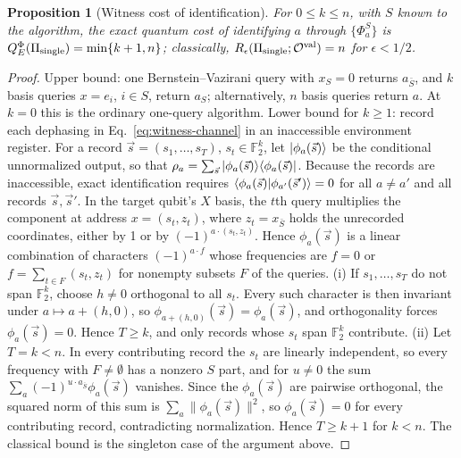 \documentclass[
  aps,
  pra,
  reprint,
  nofootinbib
]{revtex4-2}
\newtheorem{proposition}{Proposition}
\begin{document}
\begin{proposition}[Witness cost of identification]\label{prop:witness}
For \(0\le k\le n\), with \(S\) known to the algorithm, the exact quantum cost
of identifying \(a\) through \(\{\Phi_a^S\}\) is
\(Q_E^{\Phi}(\Pi_{\rm single})=\min\{k+1,n\}\); classically,
\(R_\epsilon(\Pi_{\rm single};\mathcal O^{\mathrm{val}})=n\) for
\(\epsilon<1/2\).
\end{proposition}

\begin{proof}
Upper bound: one Bernstein--Vazirani query with \(x_S=0\) returns
\(a_{\bar S}\), and \(k\) basis queries \(x=e_i\), \(i\in S\), return
\(a_S\); alternatively, \(n\) basis queries return \(a\). At \(k=0\) this is
the ordinary one-query algorithm. Lower bound for \(k\ge1\): record each
dephasing in Eq.~\eqref{eq:witness-channel} in an inaccessible environment
register. For a record \(\vec s=(s_1,\ldots,s_T)\), \(s_t\in\mathbb F_2^k\), let
\(\ket{\phi_a(\vec s)}\) be the conditional unnormalized output, so that
\(\rho_a=\sum_{\vec s}\ket{\phi_a(\vec s)}\!\bra{\phi_a(\vec s)}\). Because the
records are inaccessible, exact identification requires
\(\braket{\phi_a(\vec s)|\phi_{a'}(\vec s')}=0\) for all \(a\neq a'\) and all
records \(\vec s,\vec s'\). In the target qubit's \(X\) basis, the \(t\)th query
multiplies the component at address \(x=(s_t,z_t)\), where \(z_t=x_{\bar S}\)
holds the unrecorded coordinates, either by 1 or by
\((-1)^{a\cdot(s_t,z_t)}\). Hence \(\phi_a(\vec s)\) is a linear combination of
characters \((-1)^{a\cdot f}\) whose frequencies are \(f=0\) or
\(f=\sum_{t\in F}(s_t,z_t)\) for nonempty subsets \(F\) of the queries.
(i) If \(s_1,\ldots,s_T\) do not span \(\mathbb F_2^k\), choose \(h\neq0\)
orthogonal to all \(s_t\). Every such character is then invariant under
\(a\mapsto a+(h,0)\), so \(\phi_{a+(h,0)}(\vec s)=\phi_a(\vec s)\), and
orthogonality forces \(\phi_a(\vec s)=0\). Hence \(T\ge k\), and only records
whose \(s_t\) span \(\mathbb F_2^k\) contribute. (ii) Let \(T=k<n\). In every
contributing record the \(s_t\) are linearly independent, so every frequency
with \(F\neq\emptyset\) has a nonzero \(S\) part, and for \(u\neq0\) the sum
\(\sum_a(-1)^{u\cdot a_{\bar S}}\phi_a(\vec s)\) vanishes. Since the
\(\phi_a(\vec s)\) are pairwise orthogonal, the squared norm of this sum is
\(\sum_a\lVert\phi_a(\vec s)\rVert^2\), so \(\phi_a(\vec s)=0\) for every
contributing record, contradicting normalization. Hence \(T\ge k+1\) for
\(k<n\). The classical bound is the singleton case of the argument above.
\end{proof}
\end{document}
